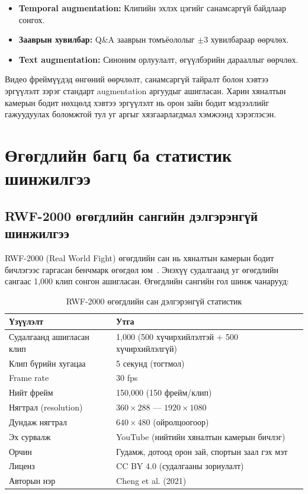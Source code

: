\begin{itemize}
    \item \textbf{Temporal augmentation:} Клипийн эхлэх цэгийг санамсаргүй байдлаар сонгох.
    \item \textbf{Зааврын хувилбар:} Q\&A зааврын томъёололыг $\pm$3 хувилбараар өөрчлөх.
    \item \textbf{Text augmentation:} Синоним орлуулалт, өгүүлбэрийн дарааллыг өөрчлөх.
\end{itemize}

\begin{sloppypar}Видео фреймүүдэд өнгөний өөрчлөлт, санамсаргүй тайралт болон хэвтээ эргүүлэлт зэрэг стандарт augmentation аргуудыг ашигласан. Харин хяналтын камерын бодит нөхцөлд хэвтээ эргүүлэлт нь орон зайн бодит мэдээллийг гажуудуулах боломжтой тул уг аргыг хязгаарлагдмал хэмжээнд хэрэглэсэн.\end{sloppypar}

\section{Өгөгдлийн багц ба статистик шинжилгээ}

\subsection{RWF-2000 өгөгдлийн сангийн дэлгэрэнгүй шинжилгээ}

RWF-2000 (Real World Fight) өгөгдлийн сан нь хяналтын камерын бодит бичлэгээс гаргасан бенчмарк өгөгдөл юм~\cite{Cheng2021}. Энэхүү судалгаанд уг өгөгдлийн сангаас 1,000 клип сонгон ашигласан. Өгөгдлийн сангийн гол шинж чанарууд:

\begin{table}[htbp]
\centering
\caption{RWF-2000 өгөгдлийн сан дэлгэрэнгүй статистик}
\label{tab:rwf2000_stats}
\begin{tabular}{ll}
\hline
\textbf{Үзүүлэлт} & \textbf{Утга} \\
\hline
Судалгаанд ашигласан клип & 1,000 (500 хүчирхийлэлтэй + 500 хүчирхийлэлгүй) \\
Клип бүрийн хугацаа      & 5 секунд (тогтмол) \\
Frame rate                & 30 fps \\
Нийт фрейм               & 150,000 (150 фрейм/клип) \\
Нягтрал (resolution)     & $360 \times 288$ --- $1920 \times 1080$ \\
Дундаж нягтрал            & $640 \times 480$ (ойролцоогоор) \\
Эх сурвалж                & YouTube (нийтийн хяналтын камерын бичлэг) \\
Орчин                    & Гудамж, дотоод орон зай, спортын заал гэх мэт \\
Лиценз                   & CC BY 4.0 (судалгааны зориулалт) \\
Авторын нэр              & Cheng et al. (2021) \\
\hline
\end{tabular}
\end{table}

